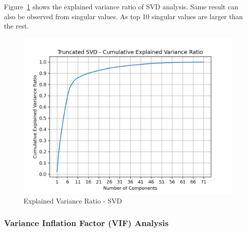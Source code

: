 Figure~\ref{fig:svd} shows the explained variance ratio of SVD analysis. Same result can also be observed from singular values. As top 10 singular values are larger than the rest.

\begin{figure}[h]
    \centering
    \includegraphics[width=\textwidth]{docs//assets/svd.png}
    \caption{Explained Variance Ratio - SVD}
    \label{fig:svd}
\end{figure}

\subsubsection{Variance Inflation Factor (VIF) Analysis}

